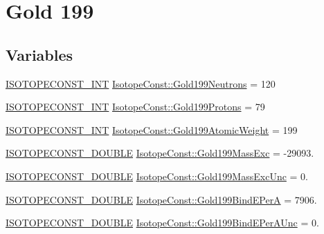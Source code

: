 \hypertarget{group___isotope_const-_gold-_au199}{}\section{Gold 199}
\label{group___isotope_const-_gold-_au199}
\subsection*{Variables}
\begin{DoxyCompactItemize}
\item 
\mbox{\hyperlink{group___isotope_const-_macros_ga5f18360b3e99483a35c32d789e62621c}{I\+S\+O\+T\+O\+P\+E\+C\+O\+N\+S\+T\+\_\+\+I\+NT}} \mbox{\hyperlink{group___isotope_const-_gold-_au199_ga397d1d2316e1772c22c456d78eb22f70}{Isotope\+Const\+::\+Gold199\+Neutrons}} = 120
\item 
\mbox{\hyperlink{group___isotope_const-_macros_ga5f18360b3e99483a35c32d789e62621c}{I\+S\+O\+T\+O\+P\+E\+C\+O\+N\+S\+T\+\_\+\+I\+NT}} \mbox{\hyperlink{group___isotope_const-_gold-_au199_ga02c45e39d6cbd0c2a5075b4a6cd173b3}{Isotope\+Const\+::\+Gold199\+Protons}} = 79
\item 
\mbox{\hyperlink{group___isotope_const-_macros_ga5f18360b3e99483a35c32d789e62621c}{I\+S\+O\+T\+O\+P\+E\+C\+O\+N\+S\+T\+\_\+\+I\+NT}} \mbox{\hyperlink{group___isotope_const-_gold-_au199_gae7dd30be77fd94bb81c64daf10d51b3e}{Isotope\+Const\+::\+Gold199\+Atomic\+Weight}} = 199
\item 
\mbox{\hyperlink{group___isotope_const-_macros_ga8f45a7272ce02c0b4c65c44636ed719a}{I\+S\+O\+T\+O\+P\+E\+C\+O\+N\+S\+T\+\_\+\+D\+O\+U\+B\+LE}} \mbox{\hyperlink{group___isotope_const-_gold-_au199_gafd670d67643adb1873815341f776da47}{Isotope\+Const\+::\+Gold199\+Mass\+Exc}} = -\/29093.
\item 
\mbox{\hyperlink{group___isotope_const-_macros_ga8f45a7272ce02c0b4c65c44636ed719a}{I\+S\+O\+T\+O\+P\+E\+C\+O\+N\+S\+T\+\_\+\+D\+O\+U\+B\+LE}} \mbox{\hyperlink{group___isotope_const-_gold-_au199_gadf636df8e4a5a04558aa1cf1da8e7d0a}{Isotope\+Const\+::\+Gold199\+Mass\+Exc\+Unc}} = 0.
\item 
\mbox{\hyperlink{group___isotope_const-_macros_ga8f45a7272ce02c0b4c65c44636ed719a}{I\+S\+O\+T\+O\+P\+E\+C\+O\+N\+S\+T\+\_\+\+D\+O\+U\+B\+LE}} \mbox{\hyperlink{group___isotope_const-_gold-_au199_ga92f361083a091f6c5b9c2fc5c3642e53}{Isotope\+Const\+::\+Gold199\+Bind\+E\+PerA}} = 7906.
\item 
\mbox{\hyperlink{group___isotope_const-_macros_ga8f45a7272ce02c0b4c65c44636ed719a}{I\+S\+O\+T\+O\+P\+E\+C\+O\+N\+S\+T\+\_\+\+D\+O\+U\+B\+LE}} \mbox{\hyperlink{group___isotope_const-_gold-_au199_ga741d25a8f2ccb4df41433b7fcc9bd214}{Isotope\+Const\+::\+Gold199\+Bind\+E\+Per\+A\+Unc}} = 0.

\end{DoxyCompactItemize}
